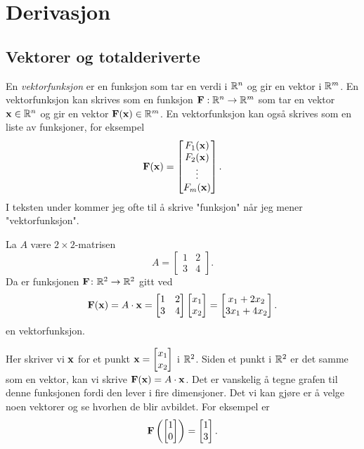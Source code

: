\section{Derivasjon}
\subsection{Vektorer og totalderiverte}
En {\em vektorfunksjon} er en funksjon som tar en verdi i $\mathbb{R}^n$ og gir en vektor i $\mathbb{R}^m$.
En vektorfunksjon kan skrives som en funksjon $\mathbf{F}:\mathbb{R}^n\to\mathbb{R}^m$ som tar en vektor $\mathbf{x}\in\mathbb{R}^n$ og gir en vektor $\mathbf{F}(\mathbf{x})\in\mathbb{R}^m$.
En vektorfunksjon kan også skrives som en liste av funksjoner, for eksempel
$$\mathbf{F}(\mathbf{x}) = \begin{bmatrix} F_1(\mathbf{x}) \\ F_2(\mathbf{x}) \\ \vdots \\ F_m(\mathbf{x}) \end{bmatrix}.$$
I teksten under kommer jeg ofte til å skrive "funksjon" når jeg mener "vektorfunksjon".

\begin{eksempel}\label{lineærfunksjon}
  La $A$ være $2 \times 2$-matrisen
  $$A = \begin{bmatrix} 1 & 2 \\ 3 & 4 \end{bmatrix}.$$
  Da er funksjonen $\mathbf{F} \colon \mathbb{R}^2 \to \mathbb{R}^2$ gitt ved
  $$\mathbf{F}(\mathbf{x}) = A \cdot \mathbf{x} = \begin{bmatrix} 1 & 2 \\ 3 & 4 \end{bmatrix}
  \begin{bmatrix} x_1 \\ x_2 \end{bmatrix} = \begin{bmatrix} x_1 + 2x_2 \\ 3x_1
  + 4x_2 \end{bmatrix}.$$
  en vektorfunksjon.

  Her skriver vi $\mathbf{x}$ for et punkt $\mathbf{x} = \begin{bmatrix} x_1 \\ x_2 \end{bmatrix}$ i $\mathbb{R}^2$.
  Siden et punkt i $\mathbb{R}^2$ er det samme som en vektor, kan vi skrive $\mathbf{F}(\mathbf{x}) = A \cdot \mathbf{x}$.
  Det er vanskelig å tegne grafen til denne funksjonen fordi den lever i fire dimensjoner.
  Det vi kan gjøre er å velge noen vektorer og se hvorhen de blir avbildet.
  For eksempel er
  $$\mathbf{F}\left(\begin{bmatrix} 1 \\ 0 \end{bmatrix}\right) = \begin{bmatrix} 1 \\ 3 \end{bmatrix}.$$
\end{eksempel}

